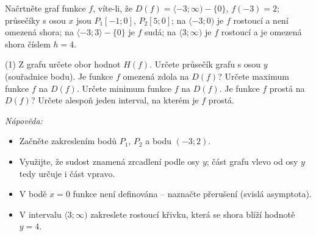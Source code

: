 \documentclass[12pt,a4paper]{article}
\begin{document}
\setcounter{section}{7}
\begin{exercise}
    Načrtněte graf funkce \(f\), víte-li, že \(D(f)=\langle -3;\infty)-\{0\}\), \(f(-3)=2\); průsečíky s osou \(x\) jsou \(P_{1}[-1;0]\), \(P_{2}[5;0]\); na \(\langle-3;0)\) je \(f\) rostoucí a není omezená shora; na \(\langle-3;3\rangle-\{0\}\) je \(f\) sudá; na \(\langle3;\infty)\) je \(f\) rostoucí a je omezená shora číslem \(h=4\).
    \begin{center}
        \begin{axisgraph}[
            xmin=-6, xmax=8,
            ymin=-4, ymax=6,
            width=12cm,
            height=6.5cm,
            axis lines=middle,
            grid=none,
            xtick={-6,-4,-2,0,2,4,6,8},
            ytick={-4,-2,0,2,4,6},
            minor tick num=1
        ]
        \end{axisgraph}
    \end{center}
    \begin{tasks}(1)
        \task Z grafu určete obor hodnot \(H(f)\).
        \task Určete průsečík grafu s osou \(y\) (souřadnice bodu).
        \task Je funkce \(f\) omezená zdola na \(D(f)\)?
        \task Určete maximum funkce \(f\) na \(D(f)\).
        \task Určete minimum funkce \(f\) na \(D(f)\).
        \task Je funkce \(f\) prostá na \(D(f)\)?
        \task Určete alespoň jeden interval, na kterém je \(f\) prostá.
    \end{tasks}

        \medskip
    \textit{Nápověda:}
    \begin{itemize}
        \item Začněte zakreslením bodů \(P_{1}\), \(P_{2}\) a bodu \((-3;2)\).
        \item Využijte, že sudost znamená zrcadlení podle osy \(y\); část grafu vlevo od osy \(y\) tedy určuje i část vpravo.
        \item V bodě \(x=0\) funkce není definována – naznačte přerušení (svislá asymptota).
        \item V intervalu \(\langle3;\infty)\) zakreslete rostoucí křivku, která se shora blíží hodnotě \(y=4\).
    \end{itemize}

\end{exercise}
\end{document}
